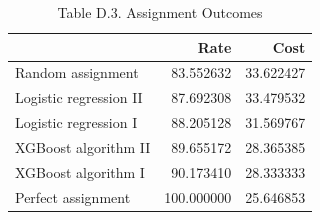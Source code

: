 \begin{table}
\caption{Table D.3. Assignment Outcomes}
\begin{tabular}{lrr}
\toprule
 & Rate & Cost \\
\midrule
Random assignment & 83.552632 & 33.622427 \\
Logistic regression II & 87.692308 & 33.479532 \\
Logistic regression I & 88.205128 & 31.569767 \\
XGBoost algorithm II & 89.655172 & 28.365385 \\
XGBoost algorithm I & 90.173410 & 28.333333 \\
Perfect assignment & 100.000000 & 25.646853 \\
\bottomrule
\end{tabular}
\end{table}
